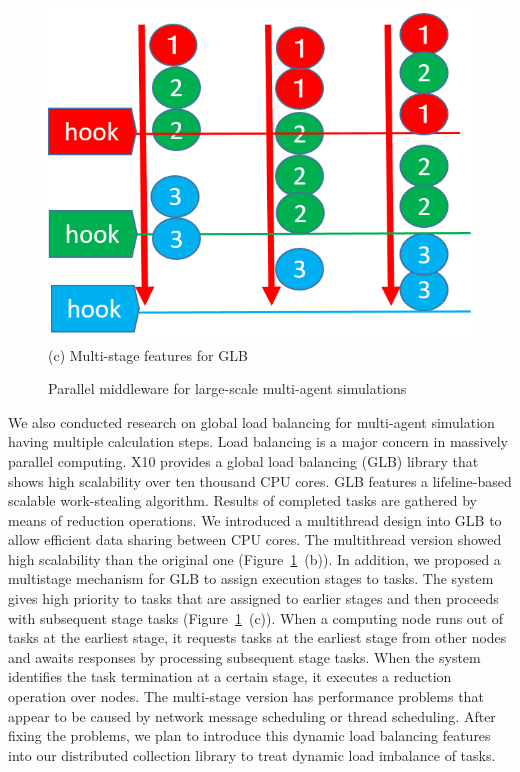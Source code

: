\begin{figure}
\begin{minipage}{.3\textwidth}
      \includegraphics[width=\textwidth]{Figs.kamada/msGLB.png}
      (c) Multi-stage features for GLB
    \end{minipage}
  \caption{Parallel middleware for large-scale multi-agent simulations}
  \label{fig:Figs.kamada/middleware}
\end{figure}


We also conducted research on global load balancing for
 multi-agent simulation having multiple calculation steps.
Load balancing is a major concern in massively parallel computing.
X10 provides a global load balancing (GLB) library that 
shows high scalability over ten thousand CPU cores.
GLB features a lifeline-based scalable work-stealing algorithm.
Results of completed tasks are gathered by means of reduction operations.
We introduced a multithread design into GLB 
to allow efficient data sharing between CPU cores.
The multithread version showed high scalability than the original one (Figure~\ref{fig:Figs.kamada/middleware}~(b)).
In addition, we proposed a multistage mechanism for GLB to 
assign execution stages to tasks.
The system gives high priority to tasks that are assigned to earlier stages
and then proceeds with subsequent stage tasks (Figure~\ref{fig:Figs.kamada/middleware}~(c)).
When a computing node runs out of tasks at the earliest stage,
it requests tasks at the earliest stage from other nodes
and awaits responses by processing subsequent stage tasks.
When the system identifies the task termination at a certain stage,
it executes a reduction operation over nodes.
The multi-stage version has performance problems
that appear to be caused by network message scheduling or thread scheduling.
After fixing the problems,
we plan to introduce this dynamic load balancing features into our distributed collection library
to treat dynamic load imbalance of tasks.









